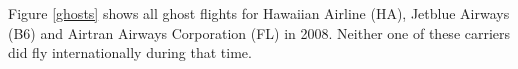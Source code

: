 \documentclass[11pt]{article}
\begin{document}




Figure \ref{ghosts} shows all ghost flights for Hawaiian Airline (HA), Jetblue Airways (B6) and Airtran Airways Corporation (FL) in 2008. Neither one of these carriers did fly internationally during that time. 
\end{document}
